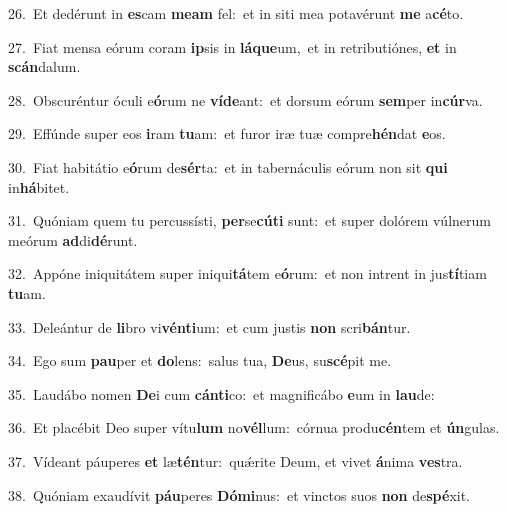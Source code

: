 {\numbfont\textcolor{\numbcolor}{26.}}~Et dedérunt in \textbf{es}\-cam \textbf{me}\-\textbf{am} fel:~\star et in siti mea potavérunt \textbf{me} a\-\textbf{cé}\-to.\par
{\numbfont\textcolor{\numbcolor}{27.}}~Fiat mensa eórum coram \textbf{ip}\-sis in \textbf{lá}\-\textbf{que}um,~\star et in retributiónes, \textbf{et} in \textbf{scán}\-dalum.\par
{\numbfont\textcolor{\numbcolor}{28.}}~Obscuréntur óculi e\-\textbf{ó}\-rum ne \textbf{ví}\-\textbf{de}ant:~\star et dorsum eórum \textbf{sem}\-per in\-\textbf{cúr}\-va.\par
{\numbfont\textcolor{\numbcolor}{29.}}~Effúnde super eos \textbf{i}\-ram \textbf{tu}\-am:~\star et furor iræ tuæ compre\-\textbf{hén}\-dat \textbf{e}\-os.\par
{\numbfont\textcolor{\numbcolor}{30.}}~Fiat habitátio e\-\textbf{ó}\-rum de\-\textbf{sér}\-ta:~\star et in tabernáculis eórum non sit \textbf{qui} in\-\textbf{há}\-bitet.\par
{\numbfont\textcolor{\numbcolor}{31.}}~Quóniam quem tu percussísti, \textbf{per}\-se\-\textbf{cú}\-\textbf{ti} sunt:~\star et super dolórem vúlnerum meórum \textbf{ad}\-di\-\textbf{dé}\-runt.\par
{\numbfont\textcolor{\numbcolor}{32.}}~Appóne iniquitátem super iniqui\-\textbf{tá}\-tem e\-\textbf{ó}\-rum:~\star et non intrent in jus\-\textbf{tí}\-tiam \textbf{tu}\-am.\par
{\numbfont\textcolor{\numbcolor}{33.}}~Deleántur de \textbf{li}\-bro vi\-\textbf{vén}\-\textbf{ti}um:~\star et cum justis \textbf{non} scri\-\textbf{bán}\-tur.\par
{\numbfont\textcolor{\numbcolor}{34.}}~Ego sum \textbf{pau}\-per et \textbf{do}\-lens:~\star salus tua, \textbf{De}\-us, su\-\textbf{scé}\-pit me.\par
{\numbfont\textcolor{\numbcolor}{35.}}~Laudábo nomen \textbf{De}\-i cum \textbf{cán}\-\textbf{ti}co:~\star et magnificábo \textbf{e}\-um in \textbf{lau}\-de:\par
{\numbfont\textcolor{\numbcolor}{36.}}~Et placébit Deo super vítu\textbf{lum} no\-\textbf{vél}\-lum:~\star córnua produ\-\textbf{cén}\-tem et \textbf{ún}\-gulas.\par
{\numbfont\textcolor{\numbcolor}{37.}}~Vídeant páuperes \textbf{et} læ\-\textbf{tén}\-tur:~\star quǽrite Deum, et vivet \textbf{á}\-nima \textbf{ves}\-tra.\par
{\numbfont\textcolor{\numbcolor}{38.}}~Quóniam exaudívit \textbf{páu}\-peres \textbf{Dó}\-\textbf{mi}nus:~\star et vinctos suos \textbf{non} de\-\textbf{spé}\-xit.\par
